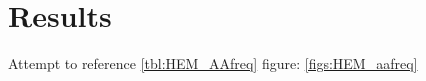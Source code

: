 \chapter{Results}
	Attempt to reference \ref{tbl:HEM_AAfreq}
	figure: \ref{figs:HEM_aafreq} \refname
